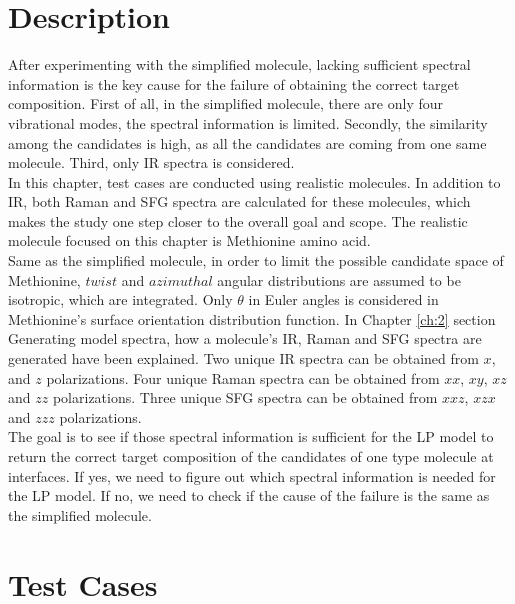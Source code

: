  \label{ch:4}
\section{Description}

After experimenting with the simplified molecule, lacking sufficient spectral information is the key cause for the failure of obtaining the correct target composition. First of all, in the simplified molecule, there are only four vibrational modes, the spectral information is limited. Secondly, the similarity among the candidates is high, as all the candidates are coming from one same molecule. Third, only IR spectra is considered. \\

In this chapter, test cases are conducted using realistic molecules. In addition to IR, both Raman and SFG spectra are calculated for these molecules, which makes the study one step closer to the overall goal and scope. The realistic molecule focused on this chapter is Methionine amino acid. \\

Same as the simplified molecule, in order to limit the possible candidate space of Methionine, $twist$ and $azimuthal$ angular distributions are assumed to be isotropic, which are integrated. Only $\theta$ in Euler angles is considered in Methionine's surface orientation distribution function. In Chapter \ref{ch:2} section Generating model spectra, how a molecule's IR, Raman and SFG spectra are generated have been explained. Two unique IR spectra can be obtained from $x$, and $z$ polarizations. Four unique Raman spectra can be obtained from $xx$, $xy$, $xz$ and $zz$ polarizations. Three unique SFG spectra can be obtained from $xxz$, $xzx$ and $zzz$ polarizations.\\

The goal is to see if those spectral information is sufficient for the LP model to return the correct target composition of the candidates of one type molecule at interfaces. If yes, we need to figure out which spectral information is needed for the LP model. If no, we need to check if the cause of the failure is the same as the simplified molecule. \\

\section{Test Cases}

